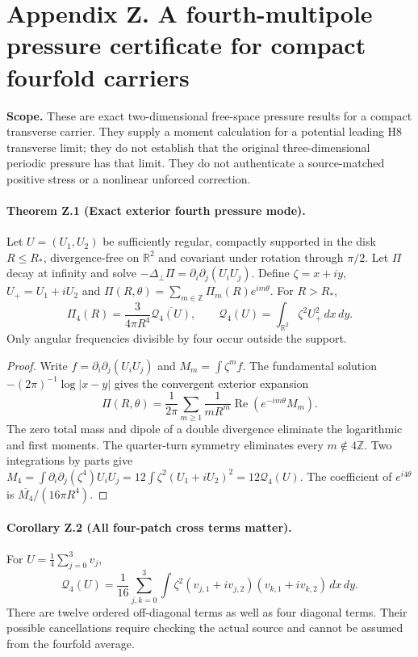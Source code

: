 \clearpage
\section*{Appendix Z. A fourth-multipole pressure certificate for compact fourfold carriers}
\noindent\textbf{Scope.} These are exact two-dimensional free-space pressure results for a compact transverse carrier. They supply a moment calculation for a potential leading H8 transverse limit; they do not establish that the original three-dimensional periodic pressure has that limit. They do not authenticate a source-matched positive stress or a nonlinear unforced correction.

\paragraph{Theorem Z.1 (Exact exterior fourth pressure mode).}
Let $U=(U_1,U_2)$ be sufficiently regular, compactly supported in the disk $R\le R_*$, divergence-free on $\mathbb R^2$ and covariant under rotation through $\pi/2$. Let $\Pi$ decay at infinity and solve $-\Delta_\perp\Pi=\partial_i\partial_j(U_iU_j)$. Define $\zeta=x+iy$, $U_+=U_1+iU_2$ and $\Pi(R,\theta)=\sum_{m\in\mathbb Z}\Pi_m(R)e^{im\theta}$. For $R>R_*$,
\begin{equation}\label{eq:Z-fourth}
\boxed{\Pi_4(R)=\frac{3}{4\pi R^4}\overline{\mathcal Q_4(U)},\qquad
\mathcal Q_4(U)=\int_{\mathbb R^2}\zeta^2U_+^2\,dx\,dy.}
\end{equation}
Only angular frequencies divisible by four occur outside the support.
\begin{proof}
Write $f=\partial_i\partial_j(U_iU_j)$ and $M_m=\int\zeta^m f$. The fundamental solution $-(2\pi)^{-1}\log|x-y|$ gives the convergent exterior expansion
\[
 \Pi(R,\theta)=\frac1{2\pi}\sum_{m\ge1}\frac{1}{mR^m}
 \operatorname{Re}(e^{-im\theta}M_m).
\]
The zero total mass and dipole of a double divergence eliminate the logarithmic and first moments. The quarter-turn symmetry eliminates every $m\notin4\mathbb Z$. Two integrations by parts give
$M_4=\int\partial_i\partial_j(\zeta^4)U_iU_j=12\int\zeta^2(U_1+iU_2)^2=12\mathcal Q_4(U)$.
The coefficient of $e^{i4\theta}$ is $\overline{M_4}/(16\pi R^4)$. \end{proof}

\paragraph{Corollary Z.2 (All four-patch cross terms matter).}
For $U=\frac14\sum_{j=0}^3v_j$,
\begin{equation}\label{eq:Z-cross}
\boxed{\mathcal Q_4(U)=\frac1{16}\sum_{j,k=0}^3
\int\zeta^2(v_{j,1}+iv_{j,2})(v_{k,1}+iv_{k,2})\,dx\,dy.}
\end{equation}
There are twelve ordered off-diagonal terms as well as four diagonal terms. Their possible cancellations require checking the actual source and cannot be assumed from the fourfold average.

